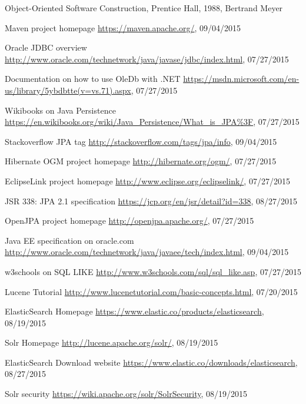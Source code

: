 \begin{thebibliography}{100}
	 Object-Oriented Software Construction, Prentice Hall, 1988, Bertrand Meyer
	
	 Maven project homepage
	\url{https://maven.apache.org/}, 09/04/2015
	
	 Oracle JDBC overview
	\url{http://www.oracle.com/technetwork/java/javase/jdbc/index.html}, 07/27/2015
	
	 Documentation on how to use OleDb with .NET
	\url{https://msdn.microsoft.com/en-us/library/5ybdbtte(v=vs.71).aspx}, 07/27/2015
	
	 Wikibooks on Java Persistence
	\url{https://en.wikibooks.org/wiki/Java_Persistence/What_is_JPA\%3F}, 07/27/2015
	
	 Stackoverflow JPA tag
	\url{http://stackoverflow.com/tags/jpa/info}, 09/04/2015
	
	 Hibernate OGM project homepage
	\url{http://hibernate.org/ogm/}, 07/27/2015
	
	 EclipseLink project homepage
	\url{http://www.eclipse.org/eclipselink/}, 07/27/2015
	
	 JSR 338: JPA 2.1 specification
	\url{https://jcp.org/en/jsr/detail?id=338}, 08/27/2015
	
	 OpenJPA project homepage
	\url{http://openjpa.apache.org/}, 07/27/2015
	
	 Java EE specification on oracle.com
	\url{http://www.oracle.com/technetwork/java/javaee/tech/index.html}, 09/04/2015
	
	 w3schools on SQL LIKE
	\url{http://www.w3schools.com/sql/sql_like.asp}, 07/27/2015
	
	 Lucene Tutorial
	\url{http://www.lucenetutorial.com/basic-concepts.html}, 07/20/2015
	
	 ElasticSearch Homepage
	\url{https://www.elastic.co/products/elasticsearch}, 08/19/2015
	
	 Solr Homepage
	\url{http://lucene.apache.org/solr/}, 08/19/2015
	
	 ElasticSearch Download website
	\url{https://www.elastic.co/downloads/elasticsearch}, 08/27/2015
	
	 Solr security
	\url{https://wiki.apache.org/solr/SolrSecurity}, 08/19/2015
	

\end{thebibliography}
